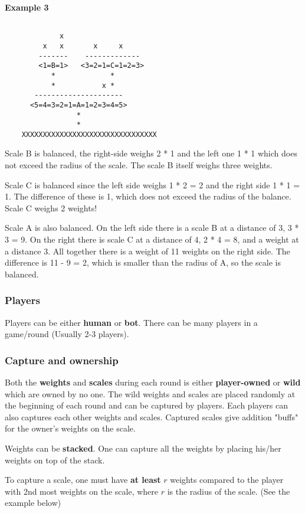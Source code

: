 \documentclass[12pt]{article}
\begin{document}
\textbf{Example 3}

\begin{verbatim}

             x
         x   x       x     x
        -------    -------------
        <1=B=1>   <3=2=1=C=1=2=3>
           *             *
           *           x *
       ---------------------
      <5=4=3=2=1=A=1=2=3=4=5>
                 *
                 *
    XXXXXXXXXXXXXXXXXXXXXXXXXXXXXXXX
\end{verbatim}

Scale B is balanced, the right-side weighs 2 * 1 and the left one 1 * 1 which
does not exceed the radius of the scale. The scale B itself weighs three
weights.

Scale C is balanced since the left side weighs 1 * 2 = 2 and the right side 1 *
1 = 1. The difference of these is 1, which does not exceed the radius of the
balance. Scale C weighs 2 weights!

Scale A is also balanced. On the left side there is a scale B at a distance of
3, 3 * 3 = 9. On the right there is scale C at a distance of 4, 2 * 4 = 8, and a
weight at a distance 3. All together there is a weight of 11 weights on the
right side. The difference is 11 - 9 = 2, which is smaller than the radius of A,
so the scale is balanced.

\subsubsection{Players}
Players can be either \textbf{human} or \textbf{bot}. There can be many players
in a game/round (Usually 2-3 players).

\subsubsection{Capture and ownership}
\label{sec:cap}

Both the \textbf{weights} and \textbf{scales} during each round is either
\textbf{player-owned} or \textbf{wild} which are owned by no one. The wild
weights and scales are placed randomly at the beginning of each round and can be
captured by players. Each players can also captures each other weights and
scales. Captured scales give addition "buffs" for the owner's weights on the
scale.

Weights can be \textbf{stacked}. One can capture all the weights by placing
his/her weights on top of the stack.

To capture a scale, one must have \textbf{at least} $r$ weights compared to the
player with 2nd most weights on the scale, where $r$ is the radius of the scale.
(See the example below)
\end{document}
